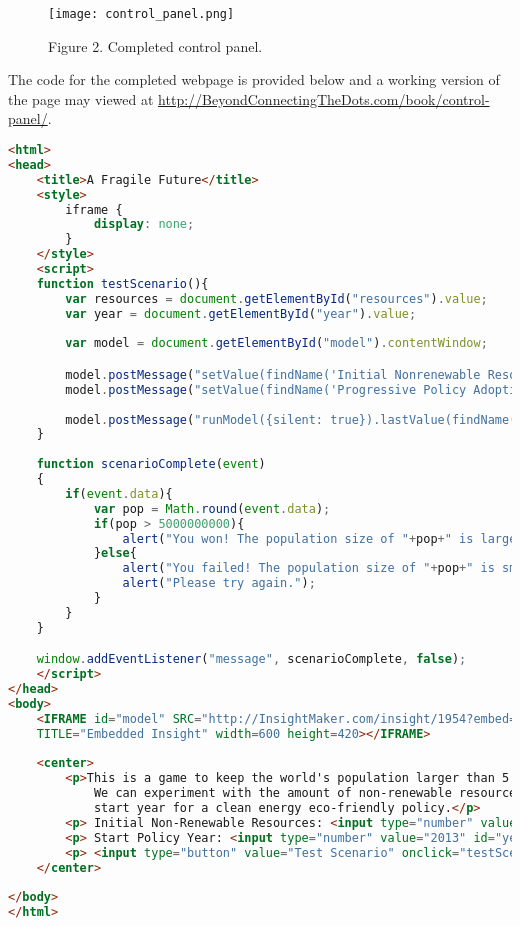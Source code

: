 \documentclass[]{memoir}
\let\Oldincludegraphics\includegraphics
\renewcommand{\includegraphics}[1]{\Oldincludegraphics[max size={\textwidth}{\textheight}]{#1}}
\begin{document}
\begin{figure}[htbp]
\centering
\texttt{[image: control\_panel.png]}
\caption{Figure 2. Completed control panel.}
\end{figure}

The code for the completed webpage is provided below and a working
version of the page may viewed at
\url{http://BeyondConnectingTheDots.com/book/control-panel/}.

\begin{lstlisting}[language=HTML]
<html>
<head>
    <title>A Fragile Future</title>
    <style>
        iframe {
            display: none;
        }
    </style>
    <script>
    function testScenario(){
        var resources = document.getElementById("resources").value;
        var year = document.getElementById("year").value;
        
        var model = document.getElementById("model").contentWindow;

        model.postMessage("setValue(findName('Initial Nonrenewable Resources'), '"+(resources/100)*1000000000000+"')", "*");
        model.postMessage("setValue(findName('Progressive Policy Adoption'), '"+year+"')", "*");
        
        model.postMessage("runModel({silent: true}).lastValue(findName('Population'))", "*");
    }
    
    function scenarioComplete(event)
    {
        if(event.data){
            var pop = Math.round(event.data);
            if(pop > 5000000000){
                alert("You won! The population size of "+pop+" is larger than 5 Billion!");
            }else{
                alert("You failed! The population size of "+pop+" is smaller than 5 Billion!");
                alert("Please try again.");
            }
        }
    }

    window.addEventListener("message", scenarioComplete, false);
    </script>
</head>
<body>
    <IFRAME id="model" SRC="http://InsightMaker.com/insight/1954?embed=1&topBar=1&sideBar=1&zoom=1"
    TITLE="Embedded Insight" width=600 height=420></IFRAME>  
    
    <center>
        <p>This is a game to keep the world's population larger than 5 billion in the year 2100.
            We can experiment with the amount of non-renewable resources in the world and the
            start year for a clean energy eco-friendly policy.</p>
        <p> Initial Non-Renewable Resources: <input type="number" value="100" id="resources" /> % </p>
        <p> Start Policy Year: <input type="number" value="2013" id="year" /> </p>
        <p> <input type="button" value="Test Scenario" onclick="testScenario()" /> </p>
    </center>
    
</body>
</html>
\end{lstlisting}
\end{document}
